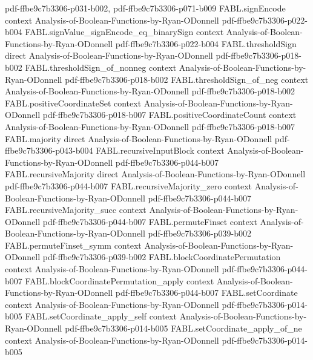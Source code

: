 \begin{theorem}
  {pdf-ffbe9c7b3306-p031-b002,
    pdf-ffbe9c7b3306-p071-b009}
\proofstep
  {FABL.signEncode}
  {context}
  {Analysis-of-Boolean-Functions-by-Ryan-ODonnell}
  {pdf-ffbe9c7b3306-p022-b004}
\proofstep
  {FABL.signValue_signEncode_eq_binarySign}
  {context}
  {Analysis-of-Boolean-Functions-by-Ryan-ODonnell}
  {pdf-ffbe9c7b3306-p022-b004}
\proofstep
  {FABL.thresholdSign}
  {direct}
  {Analysis-of-Boolean-Functions-by-Ryan-ODonnell}
  {pdf-ffbe9c7b3306-p018-b002}
\proofstep
  {FABL.thresholdSign_of_nonneg}
  {context}
  {Analysis-of-Boolean-Functions-by-Ryan-ODonnell}
  {pdf-ffbe9c7b3306-p018-b002}
\proofstep
  {FABL.thresholdSign_of_neg}
  {context}
  {Analysis-of-Boolean-Functions-by-Ryan-ODonnell}
  {pdf-ffbe9c7b3306-p018-b002}
\proofstep
  {FABL.positiveCoordinateSet}
  {context}
  {Analysis-of-Boolean-Functions-by-Ryan-ODonnell}
  {pdf-ffbe9c7b3306-p018-b007}
\proofstep
  {FABL.positiveCoordinateCount}
  {context}
  {Analysis-of-Boolean-Functions-by-Ryan-ODonnell}
  {pdf-ffbe9c7b3306-p018-b007}
\proofstep
  {FABL.majority}
  {direct}
  {Analysis-of-Boolean-Functions-by-Ryan-ODonnell}
  {pdf-ffbe9c7b3306-p043-b004}
\proofstep
  {FABL.recursiveInputBlock}
  {context}
  {Analysis-of-Boolean-Functions-by-Ryan-ODonnell}
  {pdf-ffbe9c7b3306-p044-b007}
\proofstep
  {FABL.recursiveMajority}
  {direct}
  {Analysis-of-Boolean-Functions-by-Ryan-ODonnell}
  {pdf-ffbe9c7b3306-p044-b007}
\proofstep
  {FABL.recursiveMajority_zero}
  {context}
  {Analysis-of-Boolean-Functions-by-Ryan-ODonnell}
  {pdf-ffbe9c7b3306-p044-b007}
\proofstep
  {FABL.recursiveMajority_succ}
  {context}
  {Analysis-of-Boolean-Functions-by-Ryan-ODonnell}
  {pdf-ffbe9c7b3306-p044-b007}
\proofstep
  {FABL.permuteFinset}
  {context}
  {Analysis-of-Boolean-Functions-by-Ryan-ODonnell}
  {pdf-ffbe9c7b3306-p039-b002}
\proofstep
  {FABL.permuteFinset_symm}
  {context}
  {Analysis-of-Boolean-Functions-by-Ryan-ODonnell}
  {pdf-ffbe9c7b3306-p039-b002}
\proofstep
  {FABL.blockCoordinatePermutation}
  {context}
  {Analysis-of-Boolean-Functions-by-Ryan-ODonnell}
  {pdf-ffbe9c7b3306-p044-b007}
\proofstep
  {FABL.blockCoordinatePermutation_apply}
  {context}
  {Analysis-of-Boolean-Functions-by-Ryan-ODonnell}
  {pdf-ffbe9c7b3306-p044-b007}
\proofstep
  {FABL.setCoordinate}
  {context}
  {Analysis-of-Boolean-Functions-by-Ryan-ODonnell}
  {pdf-ffbe9c7b3306-p014-b005}
\proofstep
  {FABL.setCoordinate_apply_self}
  {context}
  {Analysis-of-Boolean-Functions-by-Ryan-ODonnell}
  {pdf-ffbe9c7b3306-p014-b005}
\proofstep
  {FABL.setCoordinate_apply_of_ne}
  {context}
  {Analysis-of-Boolean-Functions-by-Ryan-ODonnell}
  {pdf-ffbe9c7b3306-p014-b005}

\end{theorem}
